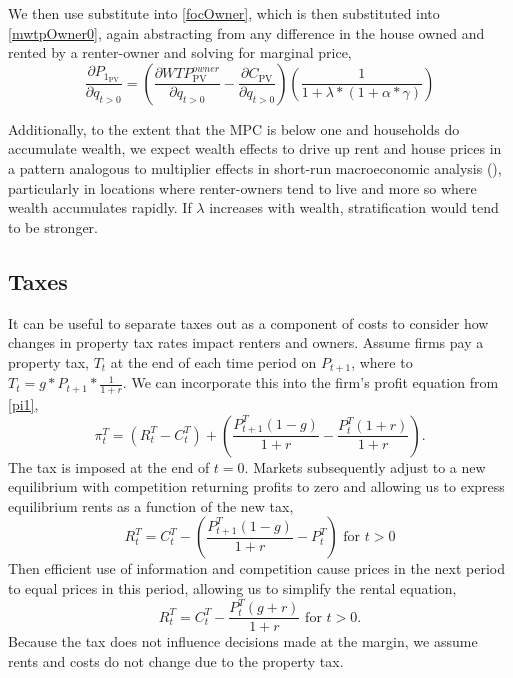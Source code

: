 \documentclass[ecta,nameyear,draft]{econsocart}
\theoremstyle{plain}
\theoremstyle{remark}
\begin{document}
We then use substitute into \ref{focOwner}, which is then substituted into \ref{mwtpOwner0}, again abstracting from any difference in the house owned and rented by a renter-owner and solving for marginal price,
\begin{equation}
\frac{\partial P_{1_{\mathrm{PV}}}} {\partial q_{t>0}}=\left(
\frac{\partial \mathit{WTP}^{\mathit{owner}}_{\mathrm{PV}}}{\partial q_{t>0}}-\frac{\partial C_{\mathrm{PV}}}{\partial q_{t>0}}\right)\left(\frac{1}{1+\lambda*\left( 1 + \alpha * \gamma\right)}\right) \label{marginalPriceManyOwners}
\end{equation}

Additionally, to the extent that the MPC is below one and households do accumulate wealth, we expect wealth effects to drive up rent and house prices in a pattern analogous to multiplier effects in short-run macroeconomic analysis (\cite{samuelson39}), particularly in locations where renter-owners tend to live and more so where wealth accumulates rapidly. If $\lambda$ increases with wealth, stratification would tend to be stronger.

 

\subsection{Taxes}
It can be useful to separate taxes out as a component of costs to consider how changes in property tax rates impact renters and owners. Assume firms pay a property tax, $T_t$ at the end of each time period on $P_{t+1}$, where to $T_t=g*P_{t+1}*\frac{1}{1+r}$. We can incorporate this into the firm's profit equation from \ref{pi1},
\begin{equation*}
	\pi^T_t = (R^T_t-C^T_t)+\left(\frac{P^T_{t+1}(1-g)}{1+r}-\frac{P^T_t(1+r)}{1+r}\right).\label{pi1T}
\end{equation*}
The tax is imposed at the end of $t=0$. Markets subsequently adjust to a new equilibrium with competition returning profits to zero and allowing us to express equilibrium rents as a function of the new tax,
\begin{equation*}
	R^T_t=C^T_t-\left(\frac{P^T_{t+1}(1-g)}{1+r}-P^T_t\right) \text{ for }t>0
\end{equation*}
Then efficient use of information and competition cause prices in the next period to equal prices in this period, allowing us to simplify the rental equation,
\begin{equation*}
R^T_t=C^T_t-\frac{P^T_{t}(g+r)}{1+r}\text{ for }t>0.
\end{equation*}
Because the tax does not influence decisions made at the margin, we assume rents and costs do not change due to the property tax. 
\end{document}
